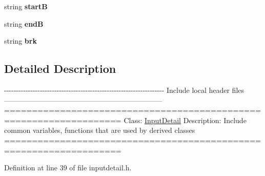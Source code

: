 \begin{DoxyCompactItemize}
\item 
\hypertarget{classPageStructureMaker_aa0f624b485f07f6e19151b1df3dc59a3}{string {\bfseries start\-B}}\label{classPageStructureMaker_aa0f624b485f07f6e19151b1df3dc59a3}

\item 
\hypertarget{classPageStructureMaker_ad46c3195310a1f0226e21d2eb5befb00}{string {\bfseries end\-B}}\label{classPageStructureMaker_ad46c3195310a1f0226e21d2eb5befb00}

\item 
\hypertarget{classPageStructureMaker_a63911cb925ccdc6c879905a677ed8881}{string {\bfseries brk}}\label{classPageStructureMaker_a63911cb925ccdc6c879905a677ed8881}

\end{DoxyCompactItemize}


\subsection{Detailed Description}
-\/-\/-\/-\/-\/-\/-\/-\/-\/-\/-\/-\/-\/-\/-\/-\/-\/-\/-\/-\/-\/-\/-\/-\/-\/-\/-\/-\/-\/-\/-\/-\/-\/-\/-\/-\/-\/-\/-\/-\/-\/-\/-\/-\/-\/-\/-\/-\/-\/-\/-\/-\/-\/-\/-\/-\/-\/-\/-\/-\/-\/-\/-\/-\/-\/-\/-\/ Include local header files ------------------------------------------------------------------ =================================================================== Class\-: \hyperlink{classInputDetail}{Input\-Detail} Description\-: Include common variables, functions that are used by derived classes =================================================================== 

Definition at line 39 of file inputdetail.\-h.



